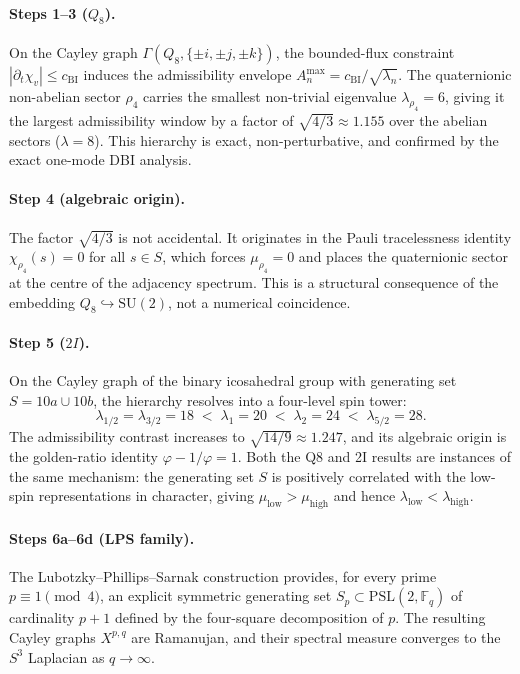 \documentclass[11pt,a4paper]{article}
\begin{document}
  \paragraph{Steps 1--3 ($Q_8$).}
    On the Cayley graph $\Gamma(Q_8, \{\pm i, \pm j, \pm k\})$, the
    bounded-flux constraint $|\partial_t\chi_v| \leq c_{\mathrm{BI}}$ induces the
    admissibility envelope $A^{\max}_n = c_{\mathrm{BI}}/\sqrt{\lambda_n}$.
    The quaternionic non-abelian sector $\rho_4$ carries the smallest
    non-trivial eigenvalue $\lambda_{\rho_4} = 6$, giving it the largest
    admissibility window by a factor of $\sqrt{4/3} \approx 1.155$ over the
    abelian sectors ($\lambda = 8$).
    This hierarchy is exact, non-perturbative, and confirmed by the exact
    one-mode DBI analysis.

  \paragraph{Step 4 (algebraic origin).}
    The factor $\sqrt{4/3}$ is not accidental.
    It originates in the Pauli tracelessness identity
    $\chi_{\rho_4}(s) = 0$ for all $s \in S$, which forces $\mu_{\rho_4} = 0$
    and places the quaternionic sector at the centre of the adjacency spectrum.
    This is a structural consequence of the embedding $Q_8 \hookrightarrow
\mathrm{SU}(2)$, not a numerical coincidence.

  \paragraph{Step 5 ($2I$).}
    On the Cayley graph of the binary icosahedral group with generating set
    $S = 10a \cup 10b$, the hierarchy resolves into a four-level spin tower:
    \begin{equation}
      \lambda_{1/2} = \lambda_{3/2} = 18
      \;<\; \lambda_1 = 20
      \;<\; \lambda_2 = 24
      \;<\; \lambda_{5/2} = 28.
      \label{eq:2I-ordering-concl}
    \end{equation}
    The admissibility contrast increases to $\sqrt{14/9} \approx 1.247$, and
    its algebraic origin is the golden-ratio identity
    $\varphi - 1/\varphi = 1$.
    Both the Q8 and 2I results are instances of the same mechanism:
    the generating set $S$ is positively correlated with the low-spin
    representations in character, giving $\mu_{\text{low}} > \mu_{\text{high}}$
    and hence $\lambda_{\text{low}} < \lambda_{\text{high}}$.

  \paragraph{Steps 6a--6d (LPS family).}
    The Lubotzky--Phillips--Sarnak construction provides, for every prime
    $p \equiv 1 \pmod 4$, an explicit symmetric generating set $S_p \subset
\mathrm{PSL}(2,\mathbb{F}_q)$ of cardinality $p+1$ defined by the
    four-square decomposition of $p$.
    The resulting Cayley graphs $X^{p,q}$ are Ramanujan, and their spectral
    measure converges to the $S^3$ Laplacian as $q \to \infty$.
\end{document}
